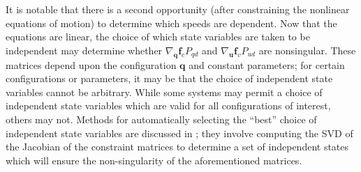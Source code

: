 \documentclass[smallcondensed,final]{svjour3}                     %
\begin{document}
It is notable that there is a second opportunity (after constraining the
nonlinear equations of motion) to determine which speeds are dependent.
Now that the equations are linear, the choice of which state variables are
taken to be independent may determine whether $\nabla_{\bm{q}}\bm{f}_{c}
P_{qd}$ and $\nabla_{\bm{u}} \bm{f}_{v} P_{ud}$ are nonsingular.
These matrices depend upon the configuration $\bm{q}$ and constant parameters;
for certain configurations or parameters, it may be that the choice of
independent state variables cannot be arbitrary.
While some systems may permit a choice of independent state variables which are
valid for all configurations of interest, others may not.
Methods for automatically selecting the ``best'' choice of independent state
variables are discussed in \cite{Reckdahl1996}; they involve computing the SVD
of the Jacobian of the constraint matrices to determine a set of independent
states which will ensure the non-singularity of the aforementioned matrices.
\end{document}
